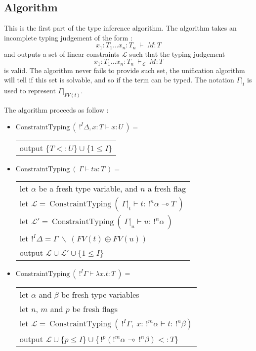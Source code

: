 \documentclass[9pt]{article}
\theoremstyle{plain}
\theoremstyle{definition}
\begin{document}
\subsection{Algorithm}

	This is the first part of the type inference algorithm.
	The algorithm takes an incomplete typing judgement of the form :
		$$x_1 : T_1 \dots x_n : T_n ~ \vdash ~ M : T$$
	and outputs a set of linear constraints $\mathcal{L}$ such that the typing judgement
	  $$x_1 : T_1 \dots x_n : T_n ~ \vdash_{\mathcal{L}} ~ M : T$$
	is valid. The algorithm never fails to provide such set, the unification algorithm will tell if this
	set is solvable, and so if the term can be typed.
	The notation $\Gamma|_t$ is used to represent $\Gamma|_{FV(t)}$.
	
	The algorithm proceeds as follow :
	\begin{itemize}
		\item $\text{ConstraintTyping} ~ (~ !^I \Delta, x : T \vdash x : U ~) = $ \\
		  \begin{tabular}{l}
				output $\{ T <: U \} \cup \{ 1 \le I \}$
		  \end{tabular}
		  
		\item $\text{ConstraintTyping} ~ (~ \Gamma \vdash t u : T ~) = $ \\
			\begin{tabular}{l}
				let $\alpha$ be a fresh type variable, and $n$ a fresh flag \\
				let $\mathcal{L} = ~ \text{ConstraintTyping} ~ (~ \Gamma|_t \vdash t : \, !^n\alpha \multimap T ~)$ \\
				let $\mathcal{L'} = ~ \text{ConstraintTyping} ~ ( ~ \Gamma|_u \vdash u : \, !^n\alpha ~)$ \\
				let $!^I\Delta = \Gamma ~ \backslash ~ (FV(t) \oplus FV(u))$ \\
				output $\mathcal{L \cup L'} \cup \{ 1 \le I \}$
			\end{tabular}
			
		\item $\text{ConstraintTyping} ~ (~ !^I \Gamma \vdash \lambda x.t : T ~) = $ \\
			\begin{tabular}{l}
				let $\alpha$ and $\beta$ be fresh type variables \\
				let $n$, $m$ and $p$ be fresh flags \\
				let $\mathcal{L} = ~ \text{ConstraintTyping} ~ ( \, !^I \Gamma, ~ x : \, !^m \alpha \vdash  t : \, !^n\beta)$ \\
				output $\mathcal{L} \cup \{ p \le I \} \cup \{ \, !^p (!^m \alpha \multimap \, !^n \beta) <: T\}$
			\end{tabular}
			

\end{itemize}
\end{document}
